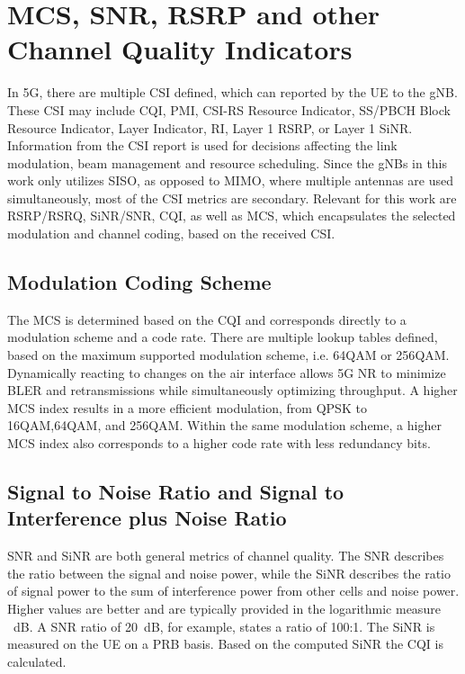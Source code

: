\section{MCS, SNR, RSRP and other Channel Quality Indicators}\label{sec:back:channel}

In 5G, there are multiple \gls{CSI} defined, which can reported by the \gls{UE} to the \gls{gNB}.
These \gls{CSI} may include \gls{CQI}, \gls{PMI}, CSI-RS Resource Indicator,
SS/PBCH Block Resource Indicator, Layer Indicator, \gls{RI}, Layer 1 \gls{RSRP}, or Layer 1 \gls{SiNR}.\cite{3gpp38.214}
Information from the \gls{CSI} report is used for decisions affecting the link modulation, beam management and resource scheduling.
Since the \gls{gNB}s in this work only utilizes \gls{SISO}, as opposed to \gls{MIMO}, where multiple antennas are used simultaneously,
most of the \gls{CSI} metrics are secondary.
Relevant for this work are \gls{RSRP}/\gls{RSRQ}, \gls{SiNR}/\gls{SNR}, \gls{CQI}, as well as \gls{MCS}, which
encapsulates the selected modulation and channel coding, based on the received \gls{CSI}.

\subsection{Modulation Coding Scheme}\label{sec:back:channelmcs}

The \gls{MCS} is determined based on the \gls{CQI} and corresponds directly to a modulation scheme and a code rate.
There are multiple lookup tables defined, based on the maximum supported modulation scheme, i.e. 64\gls{QAM} or 256\gls{QAM}.
Dynamically reacting to changes on the air interface allows 5G \gls{NR} to minimize \gls{BLER} and retransmissions
while simultaneously optimizing throughput.
A higher \gls{MCS} index results in a more efficient modulation, from \gls{QPSK} to 16\gls{QAM},64\gls{QAM}, and 256\gls{QAM}.
Within the same modulation scheme, a higher \gls{MCS} index also corresponds to a higher code rate with less redundancy bits.\cite{dahlman5GNR,3gpp38.214}

\subsection{Signal to Noise Ratio and Signal to Interference plus Noise Ratio}

\Gls{SNR} and \gls{SiNR} are both general metrics of channel quality.
The \gls{SNR} describes the ratio between the signal and noise power, while the \gls{SiNR} describes the ratio of signal
power to the sum of interference power from other cells and noise power.
Higher values are better and are typically provided in the logarithmic measure \SI{}{\deci\bel}.
A \gls{SNR} ratio of \SI{20}{\deci\bel}, for example, states a ratio of 100:1.
The \gls{SiNR} is measured on the \gls{UE} on a \gls{PRB} basis. Based on the computed \gls{SiNR} the
\gls{CQI} is calculated.\cite{afroz2015sinr}


